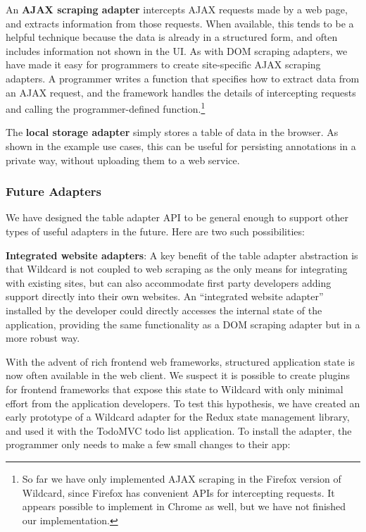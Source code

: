 \documentclass[sigplan,10pt,anonymous,review]{acmart}
\begin{document}
An \textbf{AJAX scraping adapter} intercepts AJAX requests made by a web
page, and extracts information from those requests. When available, this
tends to be a helpful technique because the data is already in a
structured form, and often includes information not shown in the UI. As
with DOM scraping adapters, we have made it easy for programmers to
create site-specific AJAX scraping adapters. A programmer writes a
function that specifies how to extract data from an AJAX request, and
the framework handles the details of intercepting requests and calling
the programmer-defined function.\footnote{So far we have only
  implemented AJAX scraping in the Firefox version of Wildcard, since
  Firefox has convenient APIs for intercepting requests. It appears
  possible to implement in Chrome as well, but we have not finished our
  implementation.}

The \textbf{local storage adapter} simply stores a table of data in the
browser. As shown in the example use cases, this can be useful for
persisting annotations in a private way, without uploading them to a web
service.

\hypertarget{future-adapters}{%
\subsubsection{Future Adapters}\label{future-adapters}}

We have designed the table adapter API to be general enough to support
other types of useful adapters in the future. Here are two such
possibilities:

\textbf{Integrated website adapters}: A key benefit of the table adapter
abstraction is that Wildcard is not coupled to web scraping as the only
means for integrating with existing sites, but can also accommodate
first party developers adding support directly into their own websites.
An ``integrated website adapter'' installed by the developer could
directly accesses the internal state of the application, providing the
same functionality as a DOM scraping adapter but in a more robust way.

With the advent of rich frontend web frameworks, structured application
state is now often available in the web client. We suspect it is
possible to create plugins for frontend frameworks that expose this
state to Wildcard with only minimal effort from the application
developers. To test this hypothesis, we have created an early prototype
of a Wildcard adapter for the Redux state management library, and used
it with the TodoMVC todo list application. To install the adapter, the
programmer only needs to make a few small changes to their app:
\end{document}
